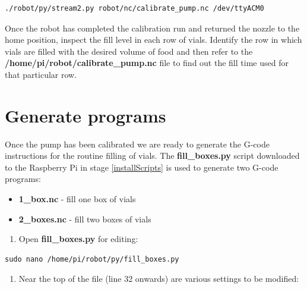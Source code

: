 \documentclass[
]{book}
\providecommand{\tightlist}{%
  \setlength{\itemsep}{0pt}\setlength{\parskip}{0pt}}
\begin{document}
\begin{verbatim}
./robot/py/stream2.py robot/nc/calibrate_pump.nc /dev/ttyACM0
\end{verbatim}

Once the robot has completed the calibration run and returned the nozzle to the home position, inspect the fill level in each row of vials. Identify the row in which vials are filled with the desired volume of food and then refer to the \textbf{/home/pi/robot/calibrate\_pump.nc} file to find out the fill time used for that particular row.

\hypertarget{generate-programs}{%
\section{Generate programs}\label{generate-programs}}

Once the pump has been calibrated we are ready to generate the G-code instructions for the routine filling of vials. The \textbf{fill\_boxes.py} script downloaded to the Raspberry Pi in stage \ref{installScripts} is used to generate two G-code programs:

\begin{itemize}
\tightlist
\item
  \textbf{1\_box.nc} - fill one box of vials
\item
  \textbf{2\_boxes.nc} - fill two boxes of vials
\end{itemize}

\begin{enumerate}
\def\labelenumi{\arabic{enumi}.}
\tightlist
\item
  Open \textbf{fill\_boxes.py} for editing:
\end{enumerate}

\begin{verbatim}
sudo nano /home/pi/robot/py/fill_boxes.py
\end{verbatim}

\begin{enumerate}
\def\labelenumi{\arabic{enumi}.}
\setcounter{enumi}{1}
\tightlist
\item
  Near the top of the file (line 32 onwards) are various settings to be modified:
\end{enumerate}
\end{document}
